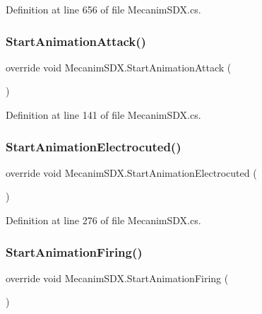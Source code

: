 Definition at line 656 of file Mecanim\+S\+D\+X.\+cs.

\mbox{\label{class_mecanim_s_d_x_a543eebebb28bb83ffc3b5cb55820f38c}} 
\subsubsection{\texorpdfstring{StartAnimationAttack()}{StartAnimationAttack()}}
{\footnotesize\ttfamily override void Mecanim\+S\+D\+X.\+Start\+Animation\+Attack (\begin{DoxyParamCaption}{ }\end{DoxyParamCaption})}



Definition at line 141 of file Mecanim\+S\+D\+X.\+cs.

\mbox{\label{class_mecanim_s_d_x_ac029e3a33e4dd0b7aa49a16da767c0bb}} 
\subsubsection{\texorpdfstring{StartAnimationElectrocuted()}{StartAnimationElectrocuted()}}
{\footnotesize\ttfamily override void Mecanim\+S\+D\+X.\+Start\+Animation\+Electrocuted (\begin{DoxyParamCaption}{ }\end{DoxyParamCaption})}



Definition at line 276 of file Mecanim\+S\+D\+X.\+cs.

\mbox{\label{class_mecanim_s_d_x_a91d1a99e0e1b013b3f7ee8285704d145}} 
\subsubsection{\texorpdfstring{StartAnimationFiring()}{StartAnimationFiring()}}
{\footnotesize\ttfamily override void Mecanim\+S\+D\+X.\+Start\+Animation\+Firing (\begin{DoxyParamCaption}{ }\end{DoxyParamCaption})}



